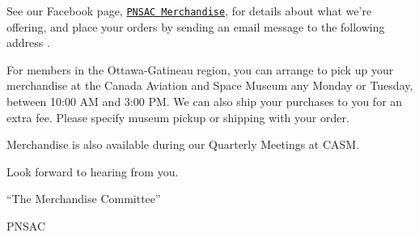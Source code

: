 See our Facebook page,
{\normalfont\color{blue}\texttt{\href{https://www.facebook.com/media/set/?set=a.610706705637878.1073741851.284829008225651&type=1}{PNSAC
      Merchandise}}}, for details about what we're offering, and place your
orders by sending an email message to the following address
.

For members in the Ottawa-Gatineau region, you can arrange to pick up
your merchandise at the Canada Aviation and Space Museum any Monday or
Tuesday, between 10:00 AM and 3:00 PM. We can also ship your purchases
to you for an extra fee. Please specify museum pickup or shipping with
your order.

Merchandise is also available during our Quarterly Meetings
at CASM.

Look forward to hearing from you.

``The Merchandise Committee''

 



\begin{footnotesize}
    \raggedleft PNSAC\\
\end{footnotesize}




